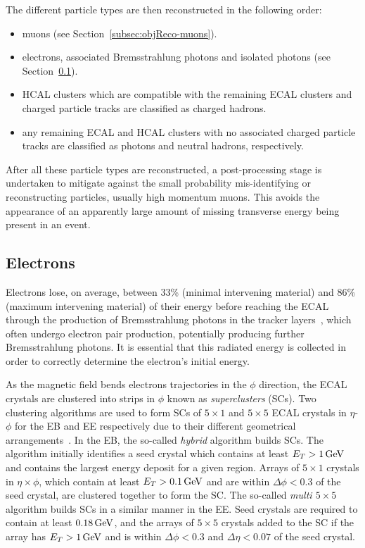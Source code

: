 The different particle types are then reconstructed in the following order: 
\begin{itemize}
\item muons (see Section~\ref{subsec:objReco-muons}).
\item electrons, associated Bremsstrahlung photons and isolated photons (see Section~\ref{subsec:objReco-electrons}).
\item HCAL clusters which are compatible with the remaining ECAL clusters and charged particle tracks are classified as charged hadrons.
\item any remaining ECAL and HCAL clusters with no associated charged particle tracks are classified as photons and neutral hadrons, respectively.
\end{itemize}

After all these particle types are reconstructed, a post-processing stage is undertaken to mitigate against the small probability mis-identifying or reconstructing particles, usually high momentum muons. 
This avoids the appearance of an apparently large amount of missing transverse energy being present in an event.

\subsection{Electrons}\label{subsec:objReco-electrons}
Electrons lose, on average, between 33\% (minimal intervening material) and 86\% (maximum intervening material) of their energy before reaching the ECAL through the production of Bremsstrahlung photons in the tracker layers~\cite{Khachatryan:2015hwa}, which often undergo electron pair production, potentially producing further Bremsstrahlung photons.	
It is essential that this radiated energy is collected in order to correctly determine the electron's initial energy.

As the magnetic field bends electrons trajectories in the $\phi$ direction, the ECAL crystals are clustered into strips in $\phi$ known as \emph{superclusters} (SCs).
Two clustering algorithms are used to form SCs of $5 \times 1$ and $5 \times 5$ ECAL crystals in $\eta$-$\phi$ for the EB and EE respectively due to their different geometrical arrangements~\cite{Khachatryan:2015hwa}.
In the EB, the so-called \emph{hybrid} algorithm builds SCs.
The algorithm initially identifies a seed crystal which contains at least $E_{T} > 1\,\text{Ge\hspace{-.08em}V}$ and contains the largest energy deposit for a given region.
Arrays of $5 \times 1$ crystals in $\eta \times \phi$, which contain at least $E_{T} > 0.1\,\text{Ge\hspace{-.08em}V}$ and are within $\Delta \phi < 0.3$ of the seed crystal, are clustered together to form the SC.
The so-called \emph{multi $5 \times 5$} algorithm builds SCs in a similar manner in the EE.
Seed crystals are required to contain at least $0.18\,\text{Ge\hspace{-.08em}V}$, and the arrays of $5 \times 5$ crystals added to the SC if the array has $E_{T} > 1\,\text{Ge\hspace{-.08em}V}$ and is within $\Delta \phi < 0.3$ and $\Delta \eta < 0.07$ of the seed crystal.

